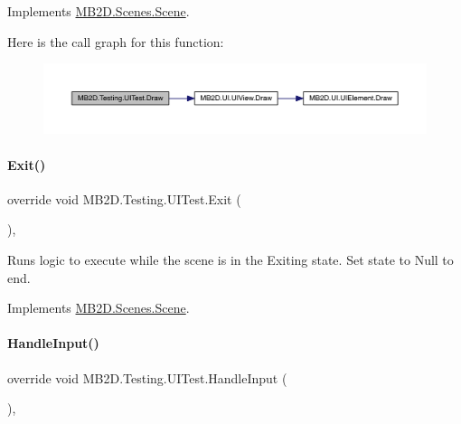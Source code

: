 Implements \hyperlink{class_m_b2_d_1_1_scenes_1_1_scene_a932d33071ecb4c5187367825dba72324}{M\+B2\+D.\+Scenes.\+Scene}.

Here is the call graph for this function\+:
\nopagebreak
\begin{figure}[H]
\begin{center}
\leavevmode
\includegraphics[width=350pt]{class_m_b2_d_1_1_testing_1_1_u_i_test_a9656d2d62517288a7b4387dafe741ea0_cgraph}
\end{center}
\end{figure}
\hypertarget{class_m_b2_d_1_1_testing_1_1_u_i_test_ad7ad379db3fc9990e634b3edbd4b1a41}{}\label{class_m_b2_d_1_1_testing_1_1_u_i_test_ad7ad379db3fc9990e634b3edbd4b1a41} 
\paragraph{\texorpdfstring{Exit()}{Exit()}}
{\footnotesize\ttfamily override void M\+B2\+D.\+Testing.\+U\+I\+Test.\+Exit (\begin{DoxyParamCaption}{ }\end{DoxyParamCaption})\hspace{0.3cm}{\ttfamily [inline]}, {\ttfamily [virtual]}}



Runs logic to execute while the scene is in the Exiting state. Set state to Null to end. 



Implements \hyperlink{class_m_b2_d_1_1_scenes_1_1_scene_a099b79e16d23b67349847999d2336813}{M\+B2\+D.\+Scenes.\+Scene}.

\hypertarget{class_m_b2_d_1_1_testing_1_1_u_i_test_abfdabac63f2f6dd07e49c181ce84b24d}{}\label{class_m_b2_d_1_1_testing_1_1_u_i_test_abfdabac63f2f6dd07e49c181ce84b24d} 
\paragraph{\texorpdfstring{Handle\+Input()}{HandleInput()}}
{\footnotesize\ttfamily override void M\+B2\+D.\+Testing.\+U\+I\+Test.\+Handle\+Input (\begin{DoxyParamCaption}{ }\end{DoxyParamCaption})\hspace{0.3cm}{\ttfamily [inline]}, {\ttfamily [virtual]}}



